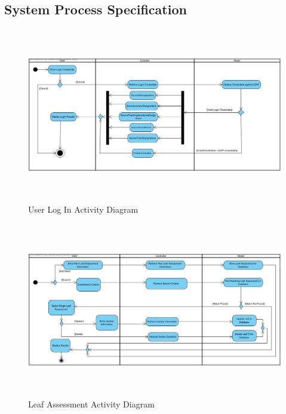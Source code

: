 \documentclass[12pt]{article}
\begin{document}
				\vspace{0.2in}
		\newpage
		\subsection{System Process Specification}%
						\begin{figure}[h]
										\centering
										\includegraphics[width=6in, height=3in]{Pictures/LoginActivityDiagram.jpg}
										\caption{User Log In Activity Diagram}
						\end{figure}
						\FloatBarrier
						\begin{figure}[h]
										\centering
										\includegraphics[width=6in, height=3in]{Pictures/LeafAssesmentActivityDiagram.jpg}
										\caption{Leaf Assessment Activity Diagram}
						\end{figure}
						\FloatBarrier
\end{document}
